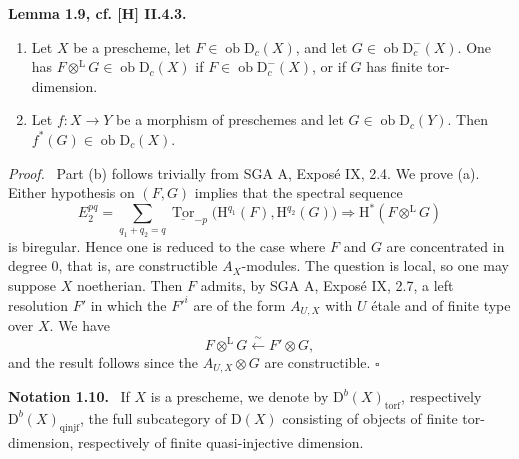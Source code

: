 \documentclass[11pt]{article}
\providecommand{\Hh}{\mathrm{H}}
\providecommand{\qedtext}{\hfill$\square$}
\newenvironment{statement}[1]{\par\medskip\noindent\textbf{#1.}\ }{\par\medskip}
\newenvironment{prooftext}[1][Proof]{\par\noindent\emph{#1.}\ }{\par\medskip}
\DeclareMathOperator{\Tor}{Tor}
\newcommand{\D}{\mathrm{D}}
\newcommand{\ob}{\operatorname{ob}}
\providecommand{\ob}{\operatorname{ob}}
\providecommand{\qedtext}{\hfill$\square$}
\begin{document}
\label{sga5:I:lemma:1.9}\begin{statement}{Lemma 1.9, cf. [H] II.4.3}
\begin{enumerate}[label=\alph*)]
\item Let $X$ be a prescheme, let $F\in\ob\D_c(X)$, and let $G\in\ob\D_c^-(X)$. One has $F\otimes^{\mathrm L}G\in\ob\D_c(X)$ if $F\in\ob\D_c^-(X)$, or if $G$ has finite tor-dimension.
\item Let $f:X\to Y$ be a morphism of preschemes and let $G\in\ob\D_c(Y)$. Then $f^*(G)\in\ob\D_c(X)$.
\end{enumerate}
\end{statement}

\begin{prooftext}
Part (b) follows trivially from SGA A, Exposé IX, 2.4. We prove (a). Either hypothesis on $(F,G)$ implies that the spectral sequence
\[
   E_2^{pq}=\sum_{q_1+q_2=q}\underline{\Tor}_{-p}\bigl(\Hh^{q_1}(F),\Hh^{q_2}(G)\bigr)
       \Rightarrow \Hh^*(F\otimes^{\mathrm L}G)
\]
is biregular. Hence one is reduced to the case where $F$ and $G$ are concentrated in degree $0$, that is, are constructible $A_X$-modules. The question is local, so one may suppose $X$ noetherian. Then $F$ admits, by SGA A, Exposé IX, 2.7, a left resolution $F'$ in which the $F'^i$ are of the form $A_{U,X}$ with $U$ étale and of finite type over $X$. We have
\[
   F\otimes^{\mathrm L}G\xleftarrow{\sim}F'\otimes G,
\]
and the result follows since the $A_{U,X}\otimes G$ are constructible. \qedtext
\end{prooftext}

\label{sga5:I:notation:1.10}\begin{statement}{Notation 1.10}
If $X$ is a prescheme, we denote by $\D^b(X)_{\mathrm{torf}}$, respectively $\D^b(X)_{\mathrm{qinjf}}$, the full subcategory of $\D(X)$ consisting of objects of finite tor-dimension, respectively of finite quasi-injective dimension.
\end{statement}
\end{document}
